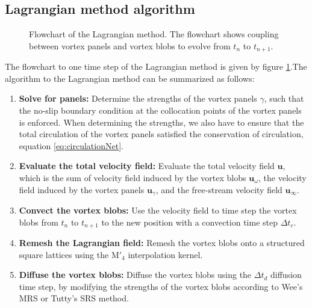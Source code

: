 \subsection*{Lagrangian method algorithm}

	\begin{figure}[!t]
		\centering
		\caption{Flowchart of the Lagrangian method. The flowchart shows coupling between vortex panels and vortex blobs to evolve from $t_n$ to $t_{n+1}$.}
		\label{fig:flowchart_lagrangian}
	\end{figure}
	
The flowchart to one time step of the Lagrangian method is given by figure \ref{fig:flowchart_lagrangian}.The algorithm to the Lagrangian method can be summarized as follows:
	\begin{enumerate}
	\item \textbf{Solve for panels:} Determine the strengths of the vortex panels $\gamma$, such that the no-slip boundary condition at the collocation points of the vortex panels is enforced. When determining the strengths, we also have to ensure that the total circulation of the vortex panels satisfied the conservation of circulation, equation \ref{eq:circulationNet}.
	\item \textbf{Evaluate the total velocity field:} Evaluate the total velocity field $\mathbf{u}$, which is the sum of velocity field induced by the vortex blobs $\mathbf{u}_{\omega}$, the velocity field induced by the vortex panels $\mathbf{u}_{\gamma}$, and the free-stream velocity field $\mathbf{u}_{\infty}$. 
	\item \textbf{Convect the vortex blobs:} Use the velocity field to time step the vortex blobs from $t_n$ to $t_{n+1}$ to the new position with a convection time step $\Delta t_c$.
	\item \textbf{Remesh the Lagrangian field:} Remesh the vortex blobs onto a structured square lattices using the $\mathrm{M}'_4$ interpolation kernel.
	\item \textbf{Diffuse the vortex blobs:} Diffuse the vortex blobs using the $\Delta t_d$ diffusion time step, by modifying the strengths of the vortex blobs according to Wee's MRS or Tutty's SRS method.
	\end{enumerate}

